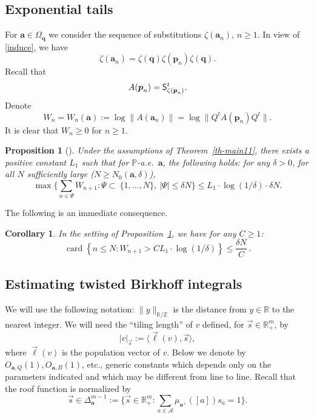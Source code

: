 \documentclass[10pt]{amsart}
\let\mathcal\mathscr
\newcommand{\sep}{:}
\theoremstyle{plain}
\newtheorem{corollary}[theorem]{Corollary}
\newtheorem{prop}[theorem]{Proposition}
\theoremstyle{definition}
\DeclareMathOperator{\card}{card}
\newcommand\bom{{\boldsymbol a}}\let\ba\bom
\newcommand\bp{{\boldsymbol p}}
\newcommand\bq{{\boldsymbol q}}
\let\Om\Omega
\newcommand\Ak{\mathcal{A}}
\newcommand{\R}{\mathbb{R}}
\newcommand{\Z}{\mathbb{Z}}
\renewcommand{\P}{\mathbb{P}}
\newcommand\Sf{{\sf S}}
\newcommand\be{\begin{equation}}
\newcommand\ee{\end{equation}}
\begin{document}
\subsection{Exponential tails}

For $\bom\in \Om_\bq$ we consider the sequence of substitutions $\zeta(\bom_n)$, $n\ge 1$. In view of \eqref{induce}, we have
\[
\zeta(\bom_n) = \zeta(\bq) \zeta(\bp_n)\zeta(\bq).
\]
Recall that
\[
A(\bp_n) = \Sf_{\zeta(\bp_n)}^t.
\]
Denote
\be \label{def-W}
W_n = W_n(\bom):=\log\|A(\bom_n)\| = \log\|Q^t A(\bp_n) Q^t\|.
\ee
It is clear that $W_n\ge 0$ for $n\ge 1$.

\begin{prop}[{\cite[Prop.\,6.1]{BuSo18a}}] \label{prop-proba}
Under the assumptions of Theorem~\ref{th-main11},
there exists a positive constant $L_1$ such that for $\P$-a.e.\ $\bom$, the following holds: for any $\delta>0$, for all $N$ sufficiently large ($N\ge N_0(\bom,\delta)$),
\be \label{w-cond2}\textstyle
\max\bigl\{\sum_{n\in \Psi} W_{n+1}\sep \Psi\subset \ \{1,\ldots,N\},\ |\Psi| \le \delta N\bigr\} \le L_1\cdot \log(1/\delta)
\cdot \delta N.
\ee
\end{prop}

The following is an immediate consequence.

\begin{corollary} \label{cor-immed}
In the setting of Proposition~\ref{prop-proba}, we have for any $C\ge 1$:
\be \label{eq-immed}
\card\left\{n\le N\sep W_{n+1} > C L_1\cdot \log(1/\delta)\right\} \le \frac{\delta N}{C}\,.
\ee
\end{corollary}

\subsection{Estimating twisted Birkhoff integrals}

We will use the following notation: $\|y\|_{\R/\Z}$ is the distance from $y\in \R$ to the nearest integer.
We will need the
``tiling length'' of $v$ defined, for $\vec s\in \R^m_+$, by
\be \label{tilength}
|v|_{\vec{s}}:= \langle\vec{\ell}(v), \vec{s}\rangle,
\ee
where $\vec{\ell}(v)$ is the population vector of $v$.
Below we denote by $O_{\bom,Q}(1), O_{\bom,B}(1)$, etc., generic constants which depends only on the parameters indicated and which may be different from line to line. Recall that the roof function is normalized by
\[\textstyle
\vec{s}\in \Delta_{\bom}^{m-1}:= \bigl\{\vec{s}\in \R^m_+\sep \sum_{a\in \Ak} \mu_{\bom^+}([a]) s_a =1\bigr\}.
\]
\end{document}
